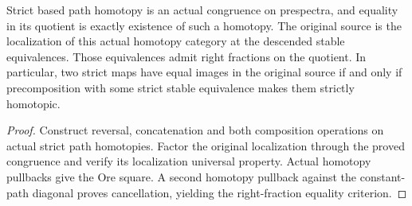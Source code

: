 \begin{proposition}
  \leanok
  Strict based path homotopy is an actual congruence on prespectra, and equality in its quotient is exactly existence of such a homotopy. The original source is the localization of this actual homotopy category at the descended stable equivalences. Those equivalences admit right fractions on the quotient. In particular, two strict maps have equal images in the original source if and only if precomposition with some strict stable equivalence makes them strictly homotopic.
\end{proposition}
\begin{proof}
  Construct reversal, concatenation and both composition operations on actual strict path homotopies. Factor the original localization through the proved congruence and verify its localization universal property. Actual homotopy pullbacks give the Ore square. A second homotopy pullback against the constant-path diagonal proves cancellation, yielding the right-fraction equality criterion.
  \leanok
\end{proof}

